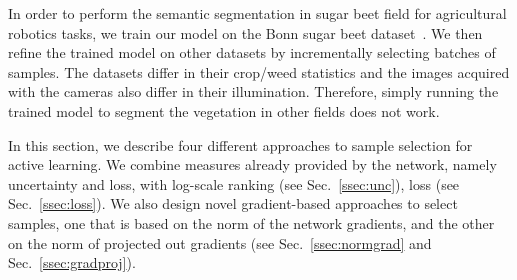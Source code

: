 \documentclass[letterpaper, 10 pt, conference]{ieeeconf}  %
\def\secref#1{Sec.~\ref{#1}}
\begin{document}
In order to perform the semantic segmentation in sugar beet field for agricultural robotics tasks,
we train our model on the Bonn sugar beet dataset~\cite{chebrolu2017agricultural}. We then refine the trained model on other datasets by incrementally selecting batches of samples. The datasets differ in their crop/weed statistics and the images acquired with the cameras also differ in their illumination. Therefore, simply running the trained model to segment the vegetation in other fields does not work.



In this section, we describe four different approaches to sample selection for active learning. We combine measures already provided by the network, namely uncertainty and loss, with log-scale ranking (see \secref{ssec:unc}), loss (see \secref{ssec:loss}). We also design novel gradient-based approaches to select samples, one that is based on the norm of the network gradients, and the other on the norm of projected out gradients (see \secref{ssec:normgrad} and \secref{ssec:gradproj}).



   
\end{document}

